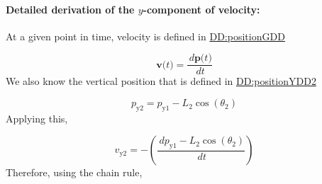 \documentclass[12pt]{article}
\begin{document}
\paragraph{Detailed derivation of the $y$-component of velocity:}
\label{GD:velocityY2Deriv}
At a given point in time, velocity is defined in \hyperref[DD:positionGDD]{DD:positionGDD}

\begin{displaymath}
\symbf{v}\text{(}t\text{)}=\frac{\,d\symbf{p}\text{(}t\text{)}}{\,dt}
\end{displaymath}
We also know the vertical position that is defined in \hyperref[DD:positionYDD2]{DD:positionYDD2}

\begin{displaymath}
{p_{\text{y}2}}={p_{\text{y}1}}-{L_{2}} \cos\left({θ_{2}}\right)
\end{displaymath}
Applying this,

\begin{displaymath}
{v_{\text{y}2}}=-\left(\frac{\,d{p_{\text{y}1}}-{L_{2}} \cos\left({θ_{2}}\right)}{\,dt}\right)
\end{displaymath}
Therefore, using the chain rule,
\end{document}
